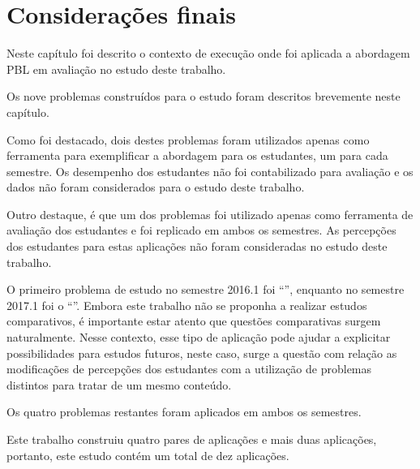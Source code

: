 \section{Considerações finais}
\label{sec-consideracoes-estudo}
Neste capítulo foi descrito o contexto de execução onde foi aplicada a
abordagem PBL em avaliação no estudo deste trabalho.

Os nove problemas construídos para o estudo foram descritos brevemente neste capítulo.

Como foi destacado, dois destes problemas foram utilizados
apenas como ferramenta para exemplificar a abordagem para os estudantes,
um para cada semestre.
Os desempenho dos estudantes não foi contabilizado para avaliação
e os dados não foram considerados para o estudo deste trabalho.

Outro destaque, é que um dos problemas foi utilizado apenas como ferramenta
de avaliação dos estudantes e foi replicado em ambos os semestres.
As percepções dos estudantes para estas aplicações não foram
consideradas no estudo deste trabalho.

O primeiro problema de estudo no semestre 2016.1 foi ``\ProblemaA'', enquanto no
semestre 2017.1 foi o ``\ProblemaG''.
Embora este trabalho não se proponha a realizar estudos comparativos, é importante
estar atento que questões comparativas surgem naturalmente.
Nesse contexto, esse tipo de aplicação pode ajudar a explicitar possibilidades para
estudos futuros, neste caso, surge a questão com relação as modificações de
percepções dos estudantes com a utilização de problemas distintos
para tratar de um mesmo conteúdo.

Os quatro problemas restantes foram aplicados em ambos os semestres.

Este trabalho construiu quatro pares de aplicações e mais duas
aplicações, portanto, este estudo contém um total de dez
aplicações.

